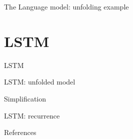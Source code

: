 \documentclass[10pt]{beamer}
\begin{document}
\begin{frame}{The Language model: unfolding example}

\end{frame}

\section{LSTM}


\begin{frame}{LSTM}

\end{frame}


\begin{frame}{LSTM: unfolded model}

\end{frame}


\begin{frame}{Simplification}

\end{frame}


\begin{frame}{LSTM: recurrence}

\end{frame}


\begin{frame}[allowframebreaks]{References}

  
  

\end{frame}
\end{document}

